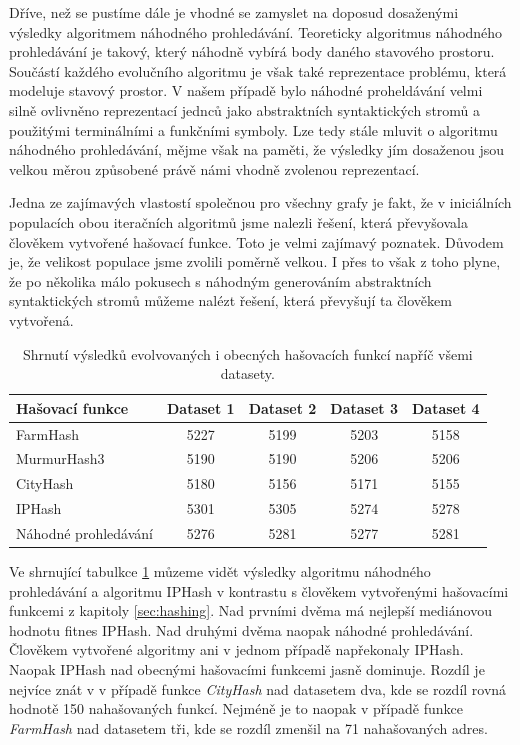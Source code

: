 Dříve, než se pustíme dále je vhodné se zamyslet na doposud dosaženými výsledky algoritmem náhodného
prohledávání. Teoreticky algoritmus náhodného prohledávání je takový, který náhodně vybírá body
daného stavového prostoru. Součástí každého evolučního algoritmu je však také reprezentace problému,
která modeluje stavový prostor. V našem případě bylo náhodné proheldávání velmi silně ovlivněno 
reprezentací jednců jako abstraktních syntaktických stromů a použitými terminálními a funkčními symboly.
Lze tedy stále mluvit o algoritmu náhodného prohledávání, mějme však na paměti, že výsledky jím
dosaženou jsou velkou měrou způsobené právě námi vhodně zvolenou reprezentací.

Jedna ze zajímavých vlastostí společnou pro všechny grafy je fakt, že v iniciálních populacích obou
iteračních algoritmů jsme nalezli řešení, která převyšovala člověkem vytvořené hašovací funkce. Toto
je velmi zajímavý poznatek. Důvodem je, že velikost populace jsme zvolili poměrně velkou. I přes to
však z toho plyne, že po několika málo pokusech s náhodným generováním abstraktních syntaktických 
stromů můžeme nalézt řešení, která převyšují ta člověkem vytvořená.

\begin{table}[!ht]
	\centering
	\begin{tabular}{l|c|c|c|c}
		Hašovací funkce & Dataset 1 & Dataset 2 & Dataset 3 & Dataset 4 \\
		\hline
		FarmHash             & 5227 & 5199 & 5203 & 5158 \\
		MurmurHash3    		 & 5190 & 5190 & 5206 & 5206 \\
		CityHash             & 5180 & 5156 & 5171 & 5155 \\
		\hline
		IPHash               & 5301 & 5305 & 5274 & 5278 \\
		Náhodné prohledávání & 5276 & 5281 & 5277 & 5281 \\
		\hline
	\end{tabular}
	\caption{Shrnutí výsledků evolvovaných i obecných hašovacích funkcí napříč všemi datasety.}
	\label{tab:IPHash_conclusion}
\end{table}

Ve shrnující tabulkce \ref{tab:IPHash_conclusion} můzeme vidět výsledky algoritmu náhodného prohledávání
a algoritmu IPHash v kontrastu s člověkem vytvořenými hašovacími funkcemi z kapitoly \ref{sec:hashing}.
Nad prvními dvěma má nejlepší mediánovou hodnotu fitnes IPHash. Nad druhými dvěma naopak náhodné prohledávání.
Člověkem vytvořené algoritmy ani v jednom případě napřekonaly IPHash. Naopak IPHash nad obecnými hašovacími
funkcemi jasně dominuje. Rozdíl je nejvíce znát v v případě funkce \textit{CityHash} nad datasetem dva, kde se rozdíl
rovná hodnotě 150 nahašovaných funkcí. Nejméně je to naopak v případě funkce \textit{FarmHash} nad datasetem tři,
kde se rozdíl zmenšil na 71 nahašovaných adres.
 
